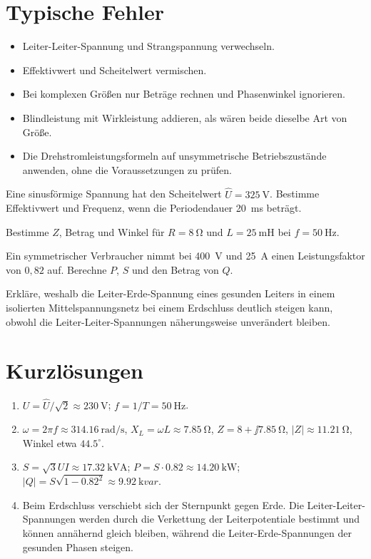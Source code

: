 \section{Typische Fehler}

\begin{itemize}
  \item Leiter-Leiter-Spannung und Strangspannung verwechseln.
  \item Effektivwert und Scheitelwert vermischen.
  \item Bei komplexen Größen nur Beträge rechnen und Phasenwinkel ignorieren.
  \item Blindleistung mit Wirkleistung addieren, als wären beide dieselbe Art
        von Größe.
  \item Die Drehstromleistungsformeln auf unsymmetrische Betriebszustände
        anwenden, ohne die Voraussetzungen zu prüfen.
\end{itemize}

\begin{aufgaben}
  \item Eine sinusförmige Spannung hat den Scheitelwert
        \(\hat U=\SI{325}{\volt}\). Bestimme Effektivwert und Frequenz,
        wenn die Periodendauer \SI{20}{\milli\second} beträgt.
  \item Bestimme \(Z\), Betrag und Winkel für \(R=\SI{8}{\ohm}\) und
        \(L=\SI{25}{\milli\henry}\) bei \(f=\SI{50}{\hertz}\).
  \item Ein symmetrischer Verbraucher nimmt bei \SI{400}{\volt} und
        \SI{25}{\ampere} einen Leistungsfaktor von \(0{,}82\) auf.
        Berechne \(P\), \(S\) und den Betrag von \(Q\).
  \item Erkläre, weshalb die Leiter-Erde-Spannung eines gesunden Leiters
        in einem isolierten Mittelspannungsnetz bei einem Erdschluss
        deutlich steigen kann, obwohl die Leiter-Leiter-Spannungen
        näherungsweise unverändert bleiben.
\end{aufgaben}

\section{Kurzlösungen}

\begin{enumerate}[label=\arabic*.]
  \item \(U=\hat U/\sqrt{2}\approx\SI{230}{\volt}\);
        \(f=1/T=\SI{50}{\hertz}\).
  \item \(\omega=2\pi f\approx\SI{314.16}{\radian\per\second}\),
        \(X_L=\omega L\approx\SI{7.85}{\ohm}\),
        \(Z=8+\jj7.85\ \si{\ohm}\),
        \(|Z|\approx\SI{11.21}{\ohm}\), Winkel etwa \(44.5^\circ\).
  \item \(S=\sqrt{3}UI\approx\SI{17.32}{\kilo\volt\ampere}\);
        \(P=S\cdot0.82\approx\SI{14.20}{\kilo\watt}\);
        \(|Q|=S\sqrt{1-0.82^2}\approx\SI{9.92}{\kilo var}\).
  \item Beim Erdschluss verschiebt sich der Sternpunkt gegen Erde. Die
        Leiter-Leiter-Spannungen werden durch die Verkettung der
        Leiterpotentiale bestimmt und können annähernd gleich bleiben,
        während die Leiter-Erde-Spannungen der gesunden Phasen steigen.
\end{enumerate}
